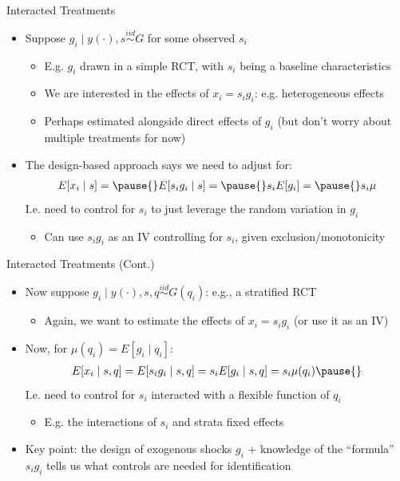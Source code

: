 \documentclass[11pt,english]{beamer}
\begin{document}
\begin{frame}{Interacted Treatments}
\begin{itemize}
\item Suppose $g_i\mid y(\cdot),s\stackrel{iid}{\sim} G$ for some observed $s_i$ \smallskip
\begin{itemize}
\item E.g. $g_i$ drawn in a simple RCT, with $s_i$ being a baseline characteristics\smallskip\pause
\item We are interested in the effects of $x_i=s_ig_i$: e.g. heterogeneous effects \smallskip\pause{}
\item Perhaps estimated alongside direct effects of $g_i$ (but don't worry about multiple treatments for now)
\end{itemize}\bigskip\pause{}
\item The design-based approach says we need to adjust for:
\begin{align*}
E[x_i\mid s]=\pause{}E[s_i g_i\mid s]=\pause{}s_i E[g_i]=\pause{} s_i \mu
\end{align*}\pause{}
I.e. need to control for $s_i$ to just leverage the random variation in $g_i$\smallskip\pause{}
\begin{itemize}
\item Can use $s_ig_i$ as an IV controlling for $s_i$, given exclusion/monotonicity
\end{itemize}
\end{itemize}
\end{frame}

\begin{frame}{Interacted Treatments (Cont.)}
\begin{itemize}
\item Now suppose $g_i\mid y(\cdot),s,q\stackrel{iid}{\sim} G(q_i)$: e.g., a stratified RCT \smallskip
\begin{itemize}
\item Again, we want to estimate the effects of $x_i=s_ig_i$ (or use it as an IV)
\end{itemize}\bigskip\pause{}
\item Now, for $\mu(q_i)=E[g_i\mid q_i]$:
\begin{align*}
E[x_i\mid s,q]=E[s_i g_i\mid s,q]=s_i E[g_i\mid s,q]=s_i \mu(q_i)\pause{}
\end{align*}
I.e. need to control for $s_i$ interacted with a flexible function of $q_i$\smallskip
\begin{itemize}
\item E.g. the interactions of $s_i$ and strata fixed effects
\end{itemize}\bigskip\pause{}
\item Key point: the design of exogenous shocks $g_i$ + knowledge of the ``formula'' $s_i g_i$ tells us what controls are needed for identification
\end{itemize}
\end{frame}
\end{document}
